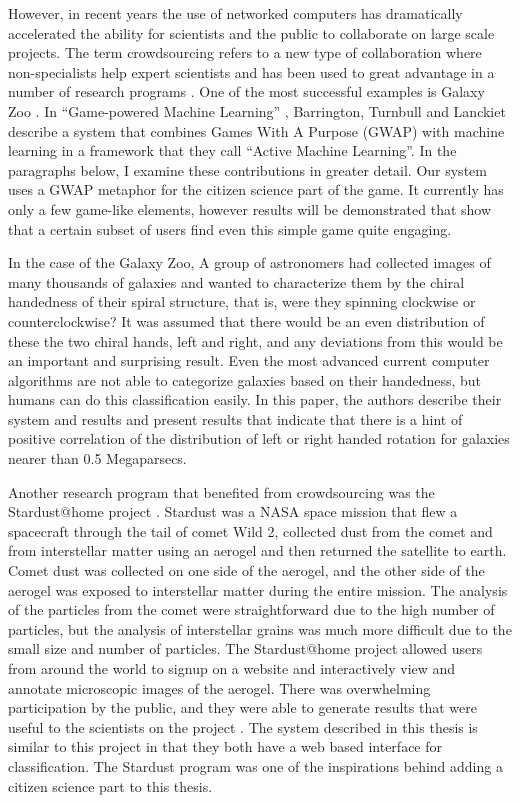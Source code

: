 \documentclass[12pt,oneside]{book}
\begin{document}
However, in recent years the use of networked computers has
dramatically accelerated the ability for scientists and the public to
collaborate on large scale projects.  The term crowdsourcing refers to
a new type of collaboration where non-specialists help expert
scientists \cite{howe08crowdsourcing} and has been used to great
advantage \cite{surowiecki05crowdsourcing} in a number
\cite{bradham08crowdsourcing} of research programs
\cite{travis08crowdsourcing}.  One of the most successful examples is
Galaxy Zoo \cite{anze08galaxyzoo}.  In ``Game-powered Machine
Learning'' \cite{barrington2012game}, Barrington, Turnbull and
Lanckiet describe a system that combines Games With A Purpose (GWAP)
with machine learning in a framework that they call ``Active Machine
Learning''.  In the paragraphs below, I examine these contributions
in greater detail.  Our system uses a GWAP metaphor for the citizen
science part of the game.  It currently has only a few game-like
elements, however results will be demonstrated that show that a
certain subset of users find even this simple game quite engaging.

In the case of the Galaxy Zoo\cite{anze08galaxyzoo}, A group of
astronomers had collected images of many thousands of galaxies and
wanted to characterize them by the chiral handedness of their spiral
structure, that is, were they spinning clockwise or counterclockwise?
It was assumed that there would be an even distribution of these the
two chiral hands, left and right, and any deviations from this would
be an important and surprising result.  Even the most advanced current
computer algorithms are not able to categorize galaxies based on their
handedness, but humans can do this classification easily.  In this
paper, the authors describe their system and results and present
results that indicate that there is a hint of positive correlation of
the distribution of left or right handed rotation for galaxies nearer
than 0.5 Megaparsecs.

Another research program that benefited from crowdsourcing was the
Stardust@home project \cite{mendez06stardust}.  Stardust
\cite{atkins97stardust} was a NASA space mission that flew a
spacecraft through the tail of comet Wild 2, collected dust from the
comet and from interstellar matter using an aerogel and then returned
the satellite to earth.  Comet dust was collected on one side of the
aerogel, and the other side of the aerogel was exposed to interstellar
matter during the entire mission.  The analysis of the particles from
the comet were straightforward due to the high number of particles,
but the analysis of interstellar grains was much more difficult due to
the small size and number of particles.  The Stardust@home project
allowed users from around the world to signup on a website and
interactively view and annotate microscopic images of the aerogel.
There was overwhelming participation by the public, and they were able
to generate results that were useful to the scientists on the project
\cite{atkins97stardust}.  The system described in this thesis is
similar to this project in that they both have a web based interface
for classification.  The Stardust program was one of the inspirations
behind adding a citizen science part to this thesis.
\end{document}
